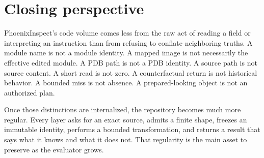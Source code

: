 \documentclass[11pt,oneside,openany]{book}
\begin{document}
\backmatter

\chapter*{Closing perspective}

PhoenixInspect's code volume comes less from the raw act of reading a field or interpreting an instruction than from refusing to conflate neighboring truths. A module name is not a module identity. A mapped image is not necessarily the effective edited module. A PDB path is not a PDB identity. A source path is not source content. A short read is not zero. A counterfactual return is not historical behavior. A bounded miss is not absence. A prepared-looking object is not an authorized plan.

Once those distinctions are internalized, the repository becomes much more regular. Every layer asks for an exact source, admits a finite shape, freezes an immutable identity, performs a bounded transformation, and returns a result that says what it knows and what it does not. That regularity is the main asset to preserve as the evaluator grows.

\listoffigures
{}
\end{document}
